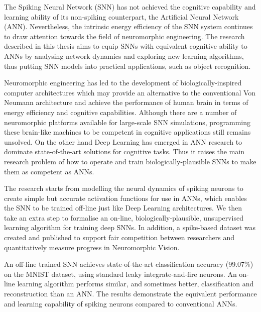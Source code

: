 The Spiking Neural Network (SNN) has not achieved the cognitive capability and learning ability of its non-spiking counterpart, the Artificial Neural Network (ANN).
Nevertheless, the intrinsic energy efficiency of the SNN system continues to draw attention towards the field of neuromorphic engineering.
The research described in this thesis aims to equip SNNs with equivalent cognitive ability to ANNs by analysing network dynamics and exploring new learning algorithms, thus putting SNN models into practical applications, such as object recognition.

Neuromorphic engineering has led to the development of biologically-inspired computer architectures which may provide an alternative to the conventional Von Neumann architecture and achieve the performance of human brain in terms of energy efficiency and cognitive capabilities.
Although there are a number of neuromorphic platforms available for large-scale SNN simulations, programming these brain-like machines to be competent in cognitive applications still remains unsolved.
On the other hand Deep Learning has emerged in ANN research to dominate state-of-the-art solutions for cognitive tasks.
Thus it raises the main research problem of how to operate and train biologically-plausible SNNs to make them as competent as ANNs.

The research starts from modelling the neural dynamics of spiking neurons to create simple but accurate activation functions for use in ANNs, which enables the SNN to be trained off-line just like Deep Learning architectures.
We then take an extra step to formalise an on-line, biologically-plausible, unsupervised learning algorithm for training deep SNNs.
In addition, a spike-based dataset was created and published to support fair competition between researchers and quantitatively measure progress in Neuromorphic Vision.

An off-line trained SNN achieves state-of-the-art classification accuracy (99.07\%) on the MNIST dataset, using standard leaky integrate-and-fire neurons.
An on-line learning algorithm performs similar, and sometimes better, classification and reconstruction than an ANN. 
The results demonstrate the equivalent performance and learning capability of spiking neurons compared to conventional ANNs.

